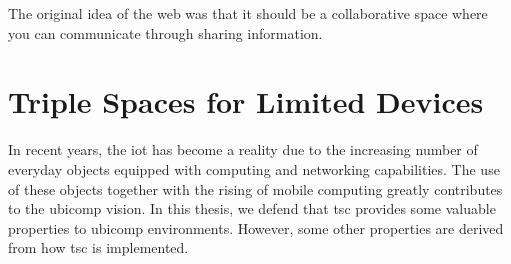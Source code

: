 
\begin{savequote}[50mm]
The original idea of the web was that it should be a collaborative space where you can communicate through sharing information.
\end{savequote}


\newcommand{\codigo}[1]{``\texttt{#1}''}
\newcommand{\primquery}{\emph{query}}
\newcommand{\primread}{\emph{read}}
\newcommand{\primtake}{\emph{take}}
\newcommand{\primwrite}{\emph{write}}


\chapter{Triple Spaces for Limited Devices}
\label{cha:tsc}
\newcommand{\pathchapthree}{3_tsc}

\ifpdf
    \graphicspath{{\pathchapthree/figures/PNG/}{\pathchapthree/figures/PDF/}{\pathchapthree/figures/}}
\else
    \graphicspath{{\pathchapthree/figures/EPS/}{\pathchapthree/figures/}}
\fi









In recent years, the \acf{iot} has become a reality due to the increasing number of everyday objects equipped with computing and networking capabilities.
The use of these objects together with the rising of mobile computing greatly contributes to the \ac{ubicomp} vision.
In this thesis, we defend that \acf{tsc} provides some valuable properties to \ac{ubicomp} environments. %
However, some other properties are derived from how \ac{tsc} is implemented. %


